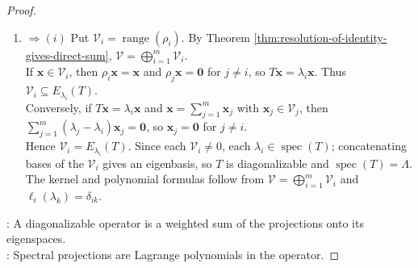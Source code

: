 \begin{theorem}
\begin{proof}
\begin{enumerate}[label=(\roman*).]
For $\ell_i(z)=\prod\limits_{j\neq i}\frac{z-\lambda_j}{\lambda_i-\lambda_j}$, we have $\ell_i(\lambda_k)=\delta_{ik}$, hence $\ell_i(T)=\rho_i$.
\item[$(ii)$]$\Rightarrow (i)$ Put $\mathcal{V}_i=\operatorname{range}(\rho_i)$. By Theorem \ref{thm:resolution-of-identity-gives-direct-sum}, $\mathcal{V}=\bigoplus\limits_{i=1}^{m}\mathcal{V}_i$.\\
If $\mathbf{x}\in\mathcal{V}_i$, then $\rho_i\mathbf{x}=\mathbf{x}$ and $\rho_j\mathbf{x}=\mathbf{0}$ for $j\neq i$, so $T\mathbf{x}=\lambda_i\mathbf{x}$. Thus $\mathcal{V}_i\subseteq E_{\lambda_i}(T)$.\\
Conversely, if $T\mathbf{x}=\lambda_i\mathbf{x}$ and $\mathbf{x}=\sum\limits_{j=1}^{m}\mathbf{x}_j$ with $\mathbf{x}_j\in\mathcal{V}_j$, then $\sum\limits_{j=1}^{m}(\lambda_j-\lambda_i)\mathbf{x}_j=\mathbf{0}$, so $\mathbf{x}_j=\mathbf{0}$ for $j\neq i$.\\
Hence $\mathcal{V}_i=E_{\lambda_i}(T)$. Since each $\mathcal{V}_i\neq0$, each $\lambda_i\in\operatorname{spec}(T)$; concatenating bases of the $\mathcal{V}_i$ gives an eigenbasis, so $T$ is diagonalizable and $\operatorname{spec}(T)=\Lambda$.\\
The kernel and polynomial formulas follow from $\mathcal{V}=\bigoplus\limits_{i=1}^{m}\mathcal{V}_i$ and $\ell_i(\lambda_k)=\delta_{ik}$.
\end{enumerate}
: A diagonalizable operator is a weighted sum of the projections onto its eigenspaces.\\
: Spectral projections are Lagrange polynomials in the operator.
\end{proof}
\end{theorem}

